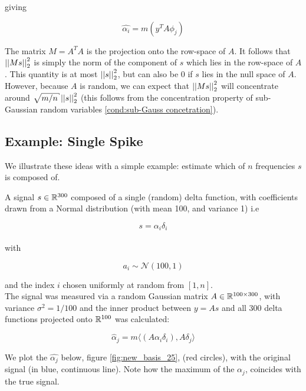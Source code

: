 giving
 
\begin{equation}
\hat{\alpha_i} = m\left(y^TA\phi_j\right)
\end{equation}

\begin{remark}
The matrix \(M = A^TA\) is the projection onto the row-space of \(A\). It follows that \(\left|\left|Ms\right|\right|_2^2\) is simply the norm of the component of \(s\) which lies in the row-space of \(A\). This quantity is at most \(\left|\left|s\right|\right|_2^2\), but can also be \(0\) if \(s\) lies in the null space of \(A\). However, because \(A\) is random, we can expect that \(\left|\left|Ms\right|\right|_2^2\) will concentrate around \(\sqrt{m/n}\vectornorm{s}_2^2\) (this follows from the concentration property of sub-Gaussian random variables \eqref{cond:sub-Gauss concetration}).
\end{remark}

\subsection{Example: Single Spike}
We illustrate these ideas with a simple example: estimate which of \(n\) frequencies \(s\) is composed of.

A signal \(s \in {\mathbb{R}}^{300}\) composed of a single (random) delta function, with coefficients drawn from a Normal distribution (with mean 100, and variance 1) i.e 

\begin{equation}
s = \alpha_i \delta_i
\end{equation}
\\
with 

\begin{equation}
a_i \sim \mathcal{N}\left(100, 1\right)
\end{equation}

and the index \(i\) chosen uniformly at random from \([1, n]\).
\\
The signal was measured via a random Gaussian matrix \(A \in {\mathbb{R}}^{100 \times 300}\), with variance \(\sigma^2 = 1/
100 \) and the inner product between \(y = As\) and all 300 delta functions projected onto \({\mathbb{R}}^{100}\) was calculated:

\begin{equation}
\hat{\alpha}_j = m\langle (A\alpha_i\delta_i), A\delta_j \rangle
\end{equation} 

We plot the \(\hat{\alpha_j}\) below, figure \ref{fig:new_basis_25}, (red circles), with the original signal (in blue, continuous line). Note how the maximum of the \(\hat{\alpha_j}\), coincides with the true signal.


